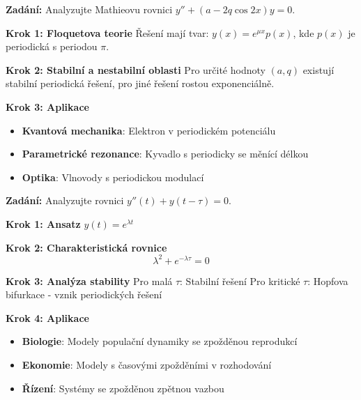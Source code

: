 \begin{example}
\label{ex:hillova-rovnice}

\noindent\textbf{Zadání:} Analyzujte Mathieovu rovnici $y'' + (a - 2q\cos 2x)y = 0$.

\vspace{1.5\baselineskip}

\noindent\textbf{Krok 1: Floquetova teorie}
Řešení mají tvar: $y(x) = e^{\mu x}p(x)$, kde $p(x)$ je periodická s periodou $\pi$.

\vspace{1\baselineskip}

\noindent\textbf{Krok 2: Stabilní a nestabilní oblasti}
Pro určité hodnoty $(a, q)$ existují stabilní periodická řešení, pro jiné řešení rostou exponenciálně.

\vspace{1\baselineskip}

\noindent\textbf{Krok 3: Aplikace}
\begin{itemize}
\item \textbf{Kvantová mechanika}: Elektron v periodickém potenciálu
\item \textbf{Parametrické rezonance}: Kyvadlo s periodicky se měnící délkou
\item \textbf{Optika}: Vlnovody s periodickou modulací
\end{itemize}

\end{example}

\begin{example}
\label{ex:rovnice-se-zpozdenim}

\noindent\textbf{Zadání:} Analyzujte rovnici $y''(t) + y(t-\tau) = 0$.

\vspace{1.5\baselineskip}

\noindent\textbf{Krok 1: Ansatz}
$y(t) = e^{\lambda t}$

\vspace{1\baselineskip}

\noindent\textbf{Krok 2: Charakteristická rovnice}
\[
\lambda^2 + e^{-\lambda\tau} = 0
\]

\vspace{1\baselineskip}

\noindent\textbf{Krok 3: Analýza stability}
Pro malá $\tau$: Stabilní řešení
Pro kritické $\tau$: Hopfova bifurkace - vznik periodických řešení

\vspace{1\baselineskip}

\noindent\textbf{Krok 4: Aplikace}
\begin{itemize}
\item \textbf{Biologie}: Modely populační dynamiky se zpožděnou reprodukcí
\item \textbf{Ekonomie}: Modely s časovými zpožděními v rozhodování
\item \textbf{Řízení}: Systémy se zpožděnou zpětnou vazbou
\end{itemize}

\end{example}

